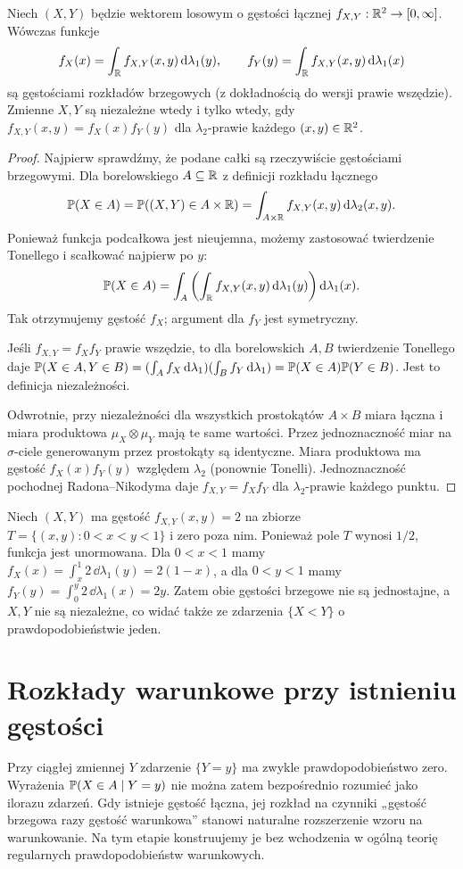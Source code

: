 \begin{twierdzenie}
Niech $(X,Y)$ będzie wektorem losowym o gęstości łącznej
$f_{X,Y}:\mathbb{R}^2\to[0,\infty]$. Wówczas funkcje
\[
f_X(x)=\int_{\mathbb{R}} f_{X,Y}(x,y)\,\mathrm{d}\lambda_1(y),\qquad
f_Y(y)=\int_{\mathbb{R}} f_{X,Y}(x,y)\,\mathrm{d}\lambda_1(x)
\]
są gęstościami rozkładów brzegowych (z dokładnością do wersji
prawie wszędzie). Zmienne $X,Y$ są niezależne wtedy i tylko wtedy,
gdy $f_{X,Y}(x,y)=f_X(x)f_Y(y)$ dla $\lambda_2$-prawie każdego
$(x,y)\in\mathbb{R}^2$.
\end{twierdzenie}
\begin{proof}
Najpierw sprawdźmy, że podane całki są rzeczywiście
gęstościami brzegowymi. Dla borelowskiego $A\subseteq\mathbb{R}$
z definicji rozkładu łącznego
\[
\mathbb{P}(X\in A)=\mathbb{P}((X,Y)\in A\times\mathbb{R})
=\int_{A\times\mathbb{R}}f_{X,Y}(x,y)\,\mathrm{d}\lambda_2(x,y).
\]
Ponieważ funkcja podcałkowa jest nieujemna, możemy
zastosować twierdzenie Tonellego i scałkować najpierw po $y$:
\[
\mathbb{P}(X\in A)=\int_A
\left(\int_{\mathbb{R}} f_{X,Y}(x,y)\,\mathrm{d}\lambda_1(y)\right)
\mathrm{d}\lambda_1(x).
\]
Tak otrzymujemy gęstość $f_X$; argument dla $f_Y$
jest symetryczny.

Jeśli $f_{X,Y}=f_X f_Y$ prawie wszędzie, to dla
borelowskich $A,B$ twierdzenie Tonellego daje
$\mathbb{P}(X\in A,Y\in B)
=(\int_A f_X\,\mathrm{d}\lambda_1)
 (\int_B f_Y\,\mathrm{d}\lambda_1)
=\mathbb{P}(X\in A)\mathbb{P}(Y\in B)$.
Jest to definicja niezależności.

Odwrotnie, przy niezależności dla wszystkich prostokątów
$A\times B$ miara łączna i miara produktowa
$\mu_X\otimes\mu_Y$ mają te same wartości.
Przez jednoznaczność miar na $\sigma$-ciele generowanym
przez prostokąty są identyczne. Miara produktowa ma
gęstość $f_X(x)f_Y(y)$ względem $\lambda_2$
(ponownie Tonelli). Jednoznaczność pochodnej
Radona--Nikodyma daje
$f_{X,Y}=f_Xf_Y$ dla $\lambda_2$-prawie każdego punktu.
\end{proof}

\begin{przyklad}
Niech $(X,Y)$ ma gęstość $f_{X,Y}(x,y)=2$ na zbiorze
$T=\{(x,y):0<x<y<1\}$ i zero poza nim.
Ponieważ pole $T$ wynosi $1/2$, funkcja jest unormowana.
Dla $0<x<1$ mamy $f_X(x)=\int_x^1 2\,\dd\lambda_1(y)=2(1-x)$,
a dla $0<y<1$ mamy $f_Y(y)=\int_0^y 2\,\dd\lambda_1(x)=2y$.
Zatem obie gęstości brzegowe nie są jednostajne, a $X,Y$ nie są
niezależne, co widać także ze zdarzenia $\{X<Y\}$
o prawdopodobieństwie jeden.
\end{przyklad}

\section{Rozkłady warunkowe przy istnieniu gęstości}
Przy ciągłej zmiennej $Y$ zdarzenie $\{Y=y\}$ ma zwykle
prawdopodobieństwo zero. Wyrażenia $\mathbb{P}(X\in A\mid Y=y)$
nie można zatem bezpośrednio rozumieć jako ilorazu zdarzeń.
Gdy istnieje gęstość łączna, jej rozkład na czynniki
„gęstość brzegowa razy gęstość warunkowa” stanowi
naturalne rozszerzenie wzoru na warunkowanie. Na tym etapie
konstruujemy je bez wchodzenia w ogólną teorię regularnych
prawdopodobieństw warunkowych.


